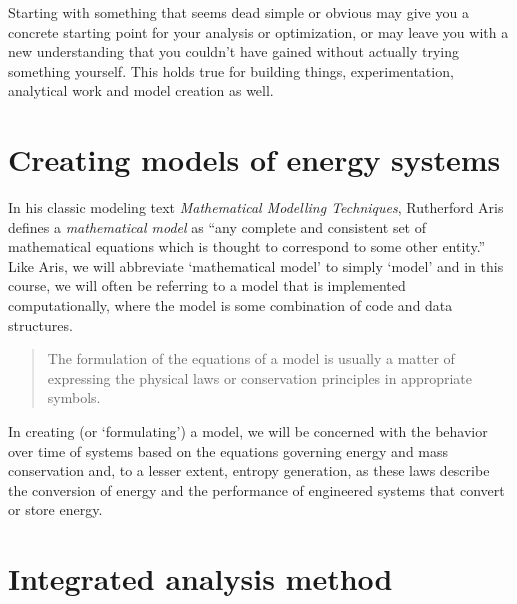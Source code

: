\documentclass[10pt]{article}
\begin{document}
Starting with something that seems dead simple or obvious may give you a concrete starting point for your analysis or optimization, or may leave you with a new understanding that you couldn't have gained without actually trying something yourself. This holds true for building things, experimentation, analytical work and model creation as well. %



\section{Creating models of energy systems}
In his classic modeling text \textit{Mathematical Modelling Techniques}, Rutherford Aris defines a \textit{mathematical model} as ``any complete and consistent set of mathematical equations which is thought to correspond to some other entity.'' \cite{aris} Like Aris, we will abbreviate `mathematical model' to simply `model' and in this course, we will often be referring to a model that is implemented computationally, where the model is some combination of code and data structures.

\begin{quote}
The formulation of the equations of a model is usually a matter of expressing the physical laws or conservation principles in appropriate symbols. \cite{aris}    
\end{quote}


In creating (or `formulating') a model, we will be concerned with the behavior over time of systems based on the equations governing energy and mass conservation and, to a lesser extent, entropy generation, as these laws describe the conversion of energy and the performance of engineered systems that convert or store energy. 

\section{Integrated analysis method}
\end{document}
